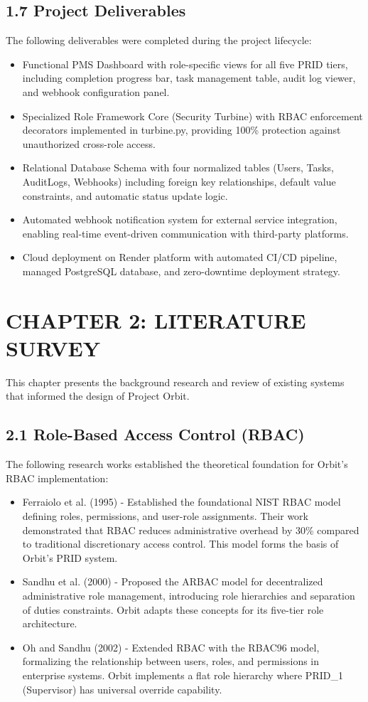 ﻿\documentclass[12pt]{article}
\def\normaltext{\fontsize{12pt}{18pt}\color{secondary}}
\begin{document}
\subsection*{1.7 Project Deliverables}
The following deliverables were completed during the project lifecycle:
\begin{itemize}
\item Functional PMS Dashboard with role-specific views for all five PRID tiers, including completion progress bar, task management table, audit log viewer, and webhook configuration panel.
\item Specialized Role Framework Core (Security Turbine) with RBAC enforcement decorators implemented in turbine.py, providing 100\% protection against unauthorized cross-role access.
\item Relational Database Schema with four normalized tables (Users, Tasks, AuditLogs, Webhooks) including foreign key relationships, default value constraints, and automatic status update logic.
\item Automated webhook notification system for external service integration, enabling real-time event-driven communication with third-party platforms.
\item Cloud deployment on Render platform with automated CI/CD pipeline, managed PostgreSQL database, and zero-downtime deployment strategy.
\end{itemize}
\newpage

\section*{{\color{primary}CHAPTER 2: LITERATURE SURVEY}}
\normaltext
This chapter presents the background research and review of existing systems that informed the design of Project Orbit.

\subsection*{2.1 Role-Based Access Control (RBAC)}
The following research works established the theoretical foundation for Orbit's RBAC implementation:
\begin{itemize}
\item {\color{secondary}Ferraiolo et al. (1995)} - Established the foundational NIST RBAC model defining roles, permissions, and user-role assignments. Their work demonstrated that RBAC reduces administrative overhead by 30\% compared to traditional discretionary access control. This model forms the basis of Orbit's PRID system.
\item {\color{secondary}Sandhu et al. (2000)} - Proposed the ARBAC model for decentralized administrative role management, introducing role hierarchies and separation of duties constraints. Orbit adapts these concepts for its five-tier role architecture.
\item {\color{secondary}Oh and Sandhu (2002)} - Extended RBAC with the RBAC96 model, formalizing the relationship between users, roles, and permissions in enterprise systems. Orbit implements a flat role hierarchy where PRID\_1 (Supervisor) has universal override capability.
\end{itemize}
\end{document}
